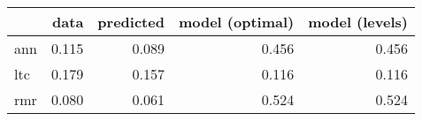 \begin{tabular}{lrrrr}
\toprule
{} &   data &  predicted &  model (optimal) &  model (levels) \\
\midrule
ann &  0.115 &      0.089 &            0.456 &           0.456 \\
ltc &  0.179 &      0.157 &            0.116 &           0.116 \\
rmr &  0.080 &      0.061 &            0.524 &           0.524 \\
\bottomrule
\end{tabular}
